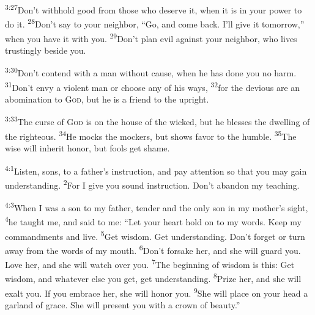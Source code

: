 \documentclass[openany,12pt,english]{book}
\newenvironment{para}{\par\pretolerance=100\tolerance=200\setlength{\emergencystretch}{0.6em}\relax}{\par}
\begin{document}
\begin{para}
    \textsuperscript{3:27}\thinspace{}Don't with\-hold good from those who de\-serve it, when it is in your pow\-er to do it.
    \textsuperscript{28}\thinspace{}Don't say to your neigh\-bor, “Go, and come back. I'll give it to\-mor\-row,” when you have it with you.
    \textsuperscript{29}\thinspace{}Don't plan evil a\-gainst your neigh\-bor, who lives trustingly be\-side you.
\end{para}

\begin{para}
    \textsuperscript{3:30}\thinspace{}Don't con\-tend with a man with\-out cause, when he has done you no harm.
    \textsuperscript{31}\thinspace{}Don't en\-vy a vi\-o\-lent man or choose any of his ways,
    \textsuperscript{32}\thinspace{}for the de\-vi\-ous are an a\-bom\-i\-na\-tion to \textsc{God}, but he is a friend to the up\-right.
\end{para}

\begin{para}
    \textsuperscript{3:33}\thinspace{}The curse of \textsc{God} is on the house of the wick\-ed, but he blesses the dwell\-ing of the right\-eous.
    \textsuperscript{34}\thinspace{}He mocks the mock\-ers, but shows fa\-vor to the hum\-ble.
    \textsuperscript{35}\thinspace{}The wise will in\-her\-it hon\-or, but fools get shame.
\end{para}

\bigskip{}

\begin{para}
    \textsuperscript{4:1}\thinspace{}Lis\-ten, sons, to a father's in\-struc\-tion, and pay at\-ten\-tion so that you may gain un\-der\-stand\-ing.
    \textsuperscript{2}\thinspace{}For I give you sound in\-struc\-tion. Don't a\-ban\-don my teach\-ing.
\end{para}

\begin{para}
    \textsuperscript{4:3}\thinspace{}When I was a son to my fa\-ther, ten\-der and the on\-ly son in my mother's sight,
    \textsuperscript{4}\thinspace{}he taught me, and said to me: “Let your heart hold on to my words. Keep my commandments and live.
    \textsuperscript{5}\thinspace{}Get wis\-dom. Get un\-der\-stand\-ing. Don't for\-get or turn a\-way from the words of my mouth.
    \textsuperscript{6}\thinspace{}Don't for\-sake her, and she will guard you. Love her, and she will watch o\-ver you.
    \textsuperscript{7}\thinspace{}The be\-gin\-ning of wis\-dom is this: Get wis\-dom, and what\-ev\-er else you get, get un\-der\-stand\-ing.
    \textsuperscript{8}\thinspace{}Prize her, and she will ex\-alt you. If you em\-brace her, she will hon\-or you.
    \textsuperscript{9}\thinspace{}She will place on your head a gar\-land of grace. She will pres\-ent you with a crown of beau\-ty.”
\end{para}
\end{document}
